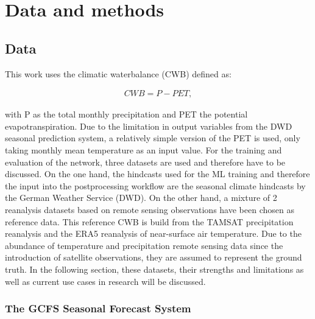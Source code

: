 \documentclass[ba-lentz.tex]{subfile}
\begin{document}
{\let\clearpage\relax \chapter{Data and methods}\label{data_methods}}

\section{Data}\label{data}

This work uses the climatic waterbalance (CWB) defined as:

\begin{align} \label{cwb}
    CWB = P - PET ,
\end{align}

with P as the total monthly precipitation and PET the potential evapotranspiration.
Due to the limitation in output variables from the DWD seasonal prediction system, a relatively simple version of the PET is used, only taking monthly mean temperature as an input value.
For the training and evaluation of the network, three datasets are used and therefore have to be discussed.
On the one hand, the hindcasts used for the ML training and therefore the input into the postprocessing workflow are the seasonal climate hindcasts by the German Weather Service (DWD).
On the other hand, a mixture of 2 reanalysis datasets based on remote sensing observations have been chosen as reference data.
This reference CWB is build from the TAMSAT precipitation reanalysis and the ERA5 reanalysis of near-surface air temperature.
Due to the abundance of temperature and precipitation remote sensing data since the introduction of satellite observations, they are assumed to represent the ground truth.
In the following section, these datasets, their strengths and limitations as well as current use cases in research will be discussed. \\

\subsection{The GCFS Seasonal Forecast System}\label{gcfs}
\end{document}

